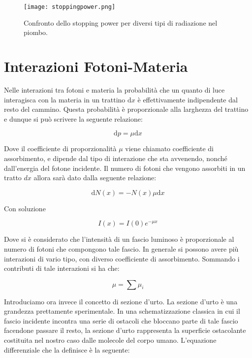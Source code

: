 \documentclass [a4paper, twoside] {book}
\begin{document}
\begin{figure} []
\centering
		\texttt{[image: stoppingpower.png]}
		\caption{Confronto dello stopping power per diversi tipi di radiazione nel piombo.}
         \label{stoppingpower}
\end{figure}


\section{Interazioni Fotoni-Materia}


Nelle interazioni tra fotoni e materia la probabilità che un quanto di luce interagisca con la materia in un trattino $\mathrm{d}x$ è effettivamente indipendente dal resto del cammino. Questa probabilità è proporzionale alla larghezza del trattino e dunque si può scrivere la seguente relazione:

\begin{equation}
\mathrm{d}p=\mu \mathrm{d}x
\end{equation}

Dove il coefficiente di proporzionalità $\mu$ viene chiamato coefficiente di assorbimento, e dipende dal tipo di interazione che sta avvenendo, nonché dall'energia del fotone incidente. Il numero di fotoni che vengono assorbiti in un tratto $dx$ allora sarà dato dalla seguente relazione:

\begin{equation}
\mathrm{d}N(x)=-N(x)\mu \mathrm{d}x
\end{equation}

Con soluzione

\begin{equation}
I(x)=I(0)e^{-\mu x}
\label{Intensity}
\end{equation}

Dove si è considerato che l'intensità di un fascio luminoso è proporzionale al numero di fotoni che compongono tale fascio.
In generale si possono avere più interazioni di vario tipo, con diverso coefficiente di assorbimento. Sommando i contributi di tale interazioni si ha che:

\begin{equation}
\mu=\sum \mu_{i}
\end{equation}

Introduciamo ora invece il concetto di sezione d'urto. 
La sezione d'urto è una grandezza prettamente sperimentale. In una schematizzazione classica in cui il fascio incidente incontra una serie di ostacoli che bloccano parte di tale fascio facendone passare il resto, la sezione d'urto rappresenta la superficie ostacolante costituita nel nostro caso dalle molecole del corpo umano. L'equazione differenziale che la definisce è la seguente:
\end{document}

